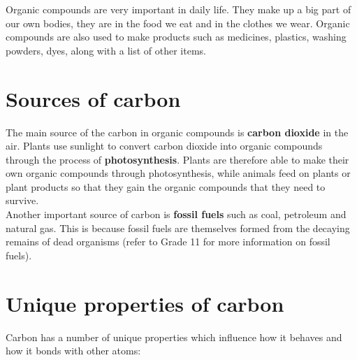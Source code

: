 Organic compounds are very important in daily life. They make up a big part of our own bodies, they are in the food we eat and in the clothes we wear. Organic compounds are also used to make products such as medicines, plastics, washing powders, dyes, along with a list of other items. 





\section{Sources of carbon}
\label{sec:om:sources}

The main source of the carbon in organic compounds is \textbf{carbon dioxide} in the air. Plants use sunlight to convert carbon dioxide into organic compounds through the process of \textbf{photosynthesis}. Plants are therefore able to make their own organic compounds through photosynthesis, while animals feed on plants or plant products so that they gain the organic compounds that they need to survive. \\

Another important source of carbon is \textbf{fossil fuels} such as coal, petroleum and natural gas. This is because fossil fuels are themselves formed from the decaying remains of dead organisms (refer to Grade 11 for more information on fossil fuels). 






\section{Unique properties of carbon}
\label{sec:om:properties}

Carbon has a number of unique properties which influence how it behaves and how it bonds with other atoms:

